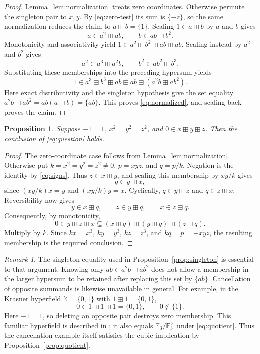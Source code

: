 \documentclass[11pt]{article}
\newtheorem{proposition}[theorem]{Proposition}
\theoremstyle{remark}
\newtheorem{remark}[theorem]{Remark}
\newcommand{\K}{\mathbb K}
\newcommand{\hs}{\boxplus}
\begin{document}
\begin{proof}
Lemma~\ref{lem:normalization} treats zero coordinates.
Otherwise permute the singleton pair to $x,y$. By
\eqref{eq:zero-test} its sum is $\{-z\}$, so the same normalization
reduces the claim to $a\hs b=\{1\}$.
Scaling $1\in a\hs b$ by $a$ and $b$ gives
\[
 a\in a^2\hs ab,\qquad b\in ab\hs b^2.
\]
Monotonicity and associativity yield
$1\in a^2\hs b^2\hs ab\hs ab$.
Scaling instead by $a^2$ and $b^2$ gives
\[
 a^2\in a^3\hs a^2b,\qquad b^2\in ab^2\hs b^3.
\]
Substituting these memberships into the preceding hypersum yields
\[
 1\in a^3\hs b^3\hs ab\hs ab\hs(a^2b\hs ab^2).
\]
Here exact distributivity and the singleton hypothesis give the
set equality $a^2b\hs ab^2=ab(a\hs b)=\{ab\}$.
This proves \eqref{eq:normalized}, and scaling back proves the claim.
\end{proof}

\begin{proposition}\label{prop:squares}
Suppose $-1=1$, $x^2=y^2=z^2$, and $0\in x\hs y\hs z$.
Then the conclusion of \eqref{eq:question} holds.
\end{proposition}

\begin{proof}
The zero-coordinate case follows from Lemma~\ref{lem:normalization}.
Otherwise put $k=x^2=y^2=z^2\ne0$, $p=xyz$, and $q=p/k$.
Negation is the identity by \eqref{eq:signs}. Thus
$z\in x\hs y$, and scaling this membership by $xy/k$ gives
\[
 q\in y\hs x,
\]
since $(xy/k)x=y$ and $(xy/k)y=x$.
Cyclically, $q\in y\hs z$ and $q\in z\hs x$.
Reversibility now gives
\[
 y\in x\hs q,\qquad z\in y\hs q,\qquad x\in z\hs q.
\]
Consequently, by monotonicity,
\[
 0\in y\hs z\hs x
 \subseteq (x\hs q)\hs(y\hs q)\hs(z\hs q).
\]
Multiply by $k$. Since $kx=x^3$, $ky=y^3$, $kz=z^3$, and
$kq=p=-xyz$, the resulting membership is the required conclusion.
\end{proof}

\begin{remark}\label{rem:cancellation}
The singleton equality used in Proposition~\ref{prop:singleton} is
essential to that argument. Knowing only $ab\in a^2b\hs ab^2$
does not allow a membership in the larger hypersum to be retained
after replacing this set by $\{ab\}$. Cancellation of opposite
summands is likewise unavailable in general. For example, in the
Krasner hyperfield $\K=\{0,1\}$ with $1\hs1=\{0,1\}$,
\[
 0\in1\hs1\hs1=\{0,1\},\qquad 0\notin\{1\}.
\]
Here $-1=1$, so deleting an opposite pair destroys zero membership.
This familiar hyperfield is described in \cite[Example~2.10]{BB};
it also equals $\mathbb F_3/\mathbb F_3^\times$ under
\eqref{eq:quotient}. Thus the cancellation example itself satisfies
the cubic implication by Proposition~\ref{prop:quotient}.
\end{remark}
\end{document}

